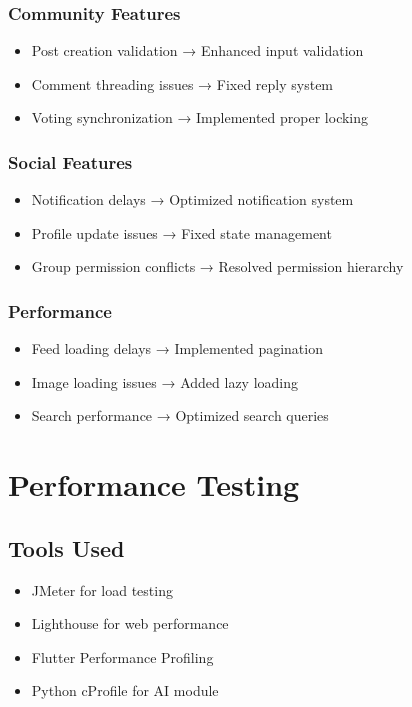 \subsubsection{Community Features}
\begin{itemize}
    \item Post creation validation → Enhanced input validation
    \item Comment threading issues → Fixed reply system
    \item Voting synchronization → Implemented proper locking
\end{itemize}

\subsubsection{Social Features}
\begin{itemize}
    \item Notification delays → Optimized notification system
    \item Profile update issues → Fixed state management
    \item Group permission conflicts → Resolved permission hierarchy
\end{itemize}

\subsubsection{Performance}
\begin{itemize}
    \item Feed loading delays → Implemented pagination
    \item Image loading issues → Added lazy loading
    \item Search performance → Optimized search queries
\end{itemize}

\section{Performance Testing}

\subsection{Tools Used}
\begin{itemize}
    \item JMeter for load testing
    \item Lighthouse for web performance
    \item Flutter Performance Profiling
    \item Python cProfile for AI module
\end{itemize}


